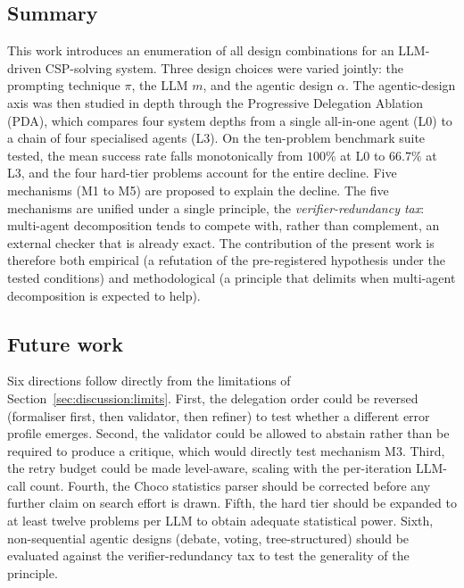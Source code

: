 \documentclass[11pt,a4paper]{article}
\begin{document}
\subsection{Summary}\label{sec:conclusion:summary}
This work introduces an enumeration of all design combinations for an LLM-driven CSP-solving system. Three design choices were varied jointly: the prompting technique $\pi$, the LLM $m$, and the agentic design $\alpha$. The agentic-design axis was then studied in depth through the Progressive Delegation Ablation (PDA), which compares four system depths from a single all-in-one agent (L0) to a chain of four specialised agents (L3). On the ten-problem benchmark suite tested, the mean success rate falls monotonically from $100\%$ at L0 to $66.7\%$ at L3, and the four hard-tier problems account for the entire decline. Five mechanisms (M1 to M5) are proposed to explain the decline. The five mechanisms are unified under a single principle, the \emph{verifier-redundancy tax}: multi-agent decomposition tends to compete with, rather than complement, an external checker that is already exact. The contribution of the present work is therefore both empirical (a refutation of the pre-registered hypothesis under the tested conditions) and methodological (a principle that delimits when multi-agent decomposition is expected to help).

\subsection{Future work}\label{sec:conclusion:future}
Six directions follow directly from the limitations of Section~\ref{sec:discussion:limits}. First, the delegation order could be reversed (formaliser first, then validator, then refiner) to test whether a different error profile emerges. Second, the validator could be allowed to abstain rather than be required to produce a critique, which would directly test mechanism M3. Third, the retry budget could be made level-aware, scaling with the per-iteration LLM-call count. Fourth, the Choco statistics parser should be corrected before any further claim on search effort is drawn. Fifth, the hard tier should be expanded to at least twelve problems per LLM to obtain adequate statistical power. Sixth, non-sequential agentic designs (debate, voting, tree-structured) should be evaluated against the verifier-redundancy tax to test the generality of the principle.

\end{document}
